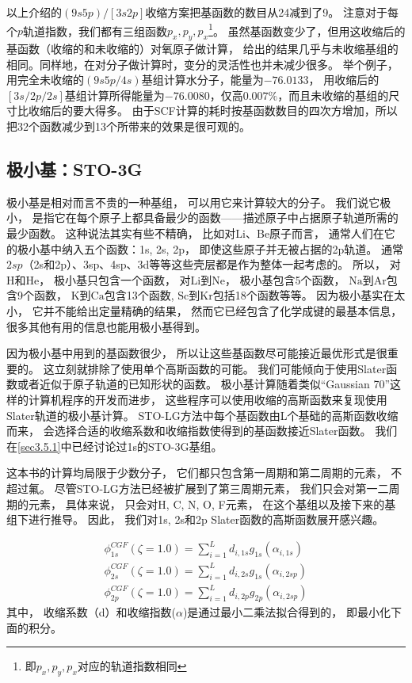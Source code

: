 以上介绍的$(9s5p)/[3s2p]$收缩方案把基函数的数目从24减到了9。
注意对于每个$p$轨道指数，我们都有三组函数$p_x,p_y,p_x$\footnote{
	即$p_x,p_y,p_x$对应的轨道指数相同
}。
虽然基函数变少了，但用这收缩后的基函数（收缩的和未收缩的）对氧原子做计算，
给出的结果几乎与未收缩基组的相同。同样地，在对分子做计算时，变分的灵活性也并未减少很多。
举个例子，用完全未收缩的$(9s5p/4s)$基组计算水分子，能量为$-76.0133$，
用收缩后的$[3s/2p/2s]$基组计算所得能量为$-76.0080$，仅高$0.007\%$，而且未收缩的基组的尺寸比收缩后的要大得多。
由于SCF计算的耗时按基函数数目的四次方增加，所以把32个函数减少到13个所带来的效果是很可观的。

\subsection{极小基：STO-3G}
极小基是相对而言不贵的一种基组，
可以用它来计算较大的分子。
我们说它极小，
是指它在每个原子上都具备最少的函数——描述原子中占据原子轨道所需的最少函数。
这种说法其实有些不精确，
比如对Li、Be原子而言，
通常人们在它的极小基中纳入五个函数：1s, 
2s, 
2p，
即使这些原子并无被占据的2p轨道。
通常$2sp$（2s和2p）、3sp、4sp、3d等等这些壳层都是作为整体一起考虑的。
所以，
对$\mathrm{H}$和$\mathrm{He}$，
极小基只包含一个函数，
对$\mathrm{Li}$到$\mathrm{Ne}$，
极小基包含5个函数，
$\mathrm{Na}$到$\mathrm{Ar}$包含9个函数，
$\mathrm{K}$到$\mathrm{Ca}$包含13个函数,
$\mathrm{Sc}$到$\mathrm{Kr}$包括18个函数等等。
因为极小基实在太小，
它并不能给出定量精确的结果，
然而它已经包含了化学成键的最基本信息，
很多其他有用的信息也能用极小基得到。


因为极小基中用到的基函数很少，
所以让这些基函数尽可能接近最优形式是很重要的。
这立刻就排除了使用单个高斯函数的可能。
我们可能倾向于使用Slater函数或者近似于原子轨道的已知形状的函数。
极小基计算随着类似“Gaussian 70”这样的计算机程序的开发而进步，
这些程序可以使用收缩的高斯函数来复现使用Slater轨道的极小基计算。
STO-LG方法中每个基函数由L个基础的高斯函数收缩而来，
会选择合适的收缩系数和收缩指数使得到的基函数接近Slater函数。
我们在\ref{sec3.5.1}中已经讨论过1s的STO-3G基组。


这本书的计算均局限于少数分子，
它们都只包含第一周期和第二周期的元素，
不超过氟。
尽管STO-LG方法已经被扩展到了第三周期元素，
我们只会对第一二周期的元素，
具体来说，
只会对H,
C,
N,
O,
F元素，
在这个基组以及接下来的基组下进行推导。
因此，
我们对1s,
2s和2p Slater函数的高斯函数展开感兴趣。

\begin{align}
	\phi_{1s}^{CGF}(\zeta=1.0)=\sum_{i=1}^{L}d_{i,1s}g_{1s}(\alpha_{i,1s})\\
	\phi_{2s}^{CGF}(\zeta=1.0)=\sum_{i=1}^{L}d_{i,2s}g_{1s}(\alpha_{i,2sp})\\
	\phi_{2p}^{CGF}(\zeta=1.0)=\sum_{i=1}^{L}d_{i,2p}g_{2p}(\alpha_{i,2sp})
\end{align}
其中，
收缩系数（d）和收缩指数($\alpha$)是通过最小二乘法拟合得到的，
即最小化下面的积分。

